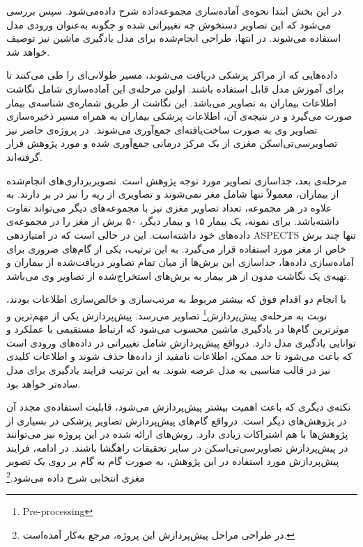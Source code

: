 

در این بخش ابتدا نحوه‌ی آماده‌سازی مجموعه‌داده شرح داده‌می‌شود.
سپس بررسی می‌شود که این تصاویر دستخوش چه تغییراتی شده و چگونه به‌عنوان ورودی مدل استفاده می‌شوند.
در انتها، طراحی انجام‌شده برای مدل یادگیری ماشین نیز توصیف خواهد شد.


داده‌هایی که از مراکز پزشکی دریافت می‌شوند، مسیر طولانی‌ای را طی می‌کنند تا برای آموزش مدل قابل استفاده باشند.
اولین مرحله‌ی این آماده‌سازی شامل نگاشت اطلاعات بیماران به تصاویر می‌باشد.
این نگاشت از طریق شماره‌ی شناسه‌ی بیمار صورت می‌گیرد 
و در نتیجه‌ی آن، اطلاعات پزشکی بیماران به همراه مسیر ذخیره‌سازی تصاویر وی به صورت ساخت‌یافته‌ای جمع‌آوری می‌شوند.\
در پروژه‌ی حاضر نیز تصاویرسی‌تی‌اسکن مغزی از یک مرکز درمانی جمع‌آوری شده و مورد پژوهش قرار گرفته‌اند.

مرحله‌ی بعد، جداسازی تصاویر مورد توجه پژوهش است.
تصویربرداری‌های انجام‌شده از بیماران، معمولاً تنها شامل مغز نمی‌شوند و تصاویری از ریه را نیز در بر دارند.
به علاوه در هر مجموعه، تعداد تصاویر مغزی نیز با مجموعه‌های دیگر می‌تواند تفاوت داشته‌باشد.
برای نمونه، یک بیمار ۱۵ و بیمار دیگر، ۵۰ برش از مغز را در مجموعه‌ی داده‌های خود داشته‌است.
این در حالی است که در امتیازدهی ASPECTS تنها چند برش خاص از مغز مورد استفاده قرار می‌گیرد.
به این ترتیب، یکی از گام‌های ضروری برای آماده‌سازی داده‌ها، جداسازی این برش‌ها از میان تمام 
تصاویر دریافت‌شده از بیماران و تهیه‌ی یک نگاشت مدون از هر بیمار به برش‌های استخراج‌شده از تصاویر وی می‌باشد.

با انجام دو اقدام فوق که بیشتر مربوط به مرتب‌سازی و خالص‌سازی اطلاعات بودند، نوبت به مرحله‌ی 
پیش‌پردازش\footnote{Pre-processing}
تصاویر می‌رسد.
پیش‌پردازش یکی از مهم‌ترین و موثرترین گام‌ها در یادگیری ماشین محسوب می‌شود که ارتباط مستقیمی با عملکرد و توانایی یادگیری مدل دارد. 
درواقع پیش‌پردازش شامل تغییراتی در داده‌های ورودی است که باعث می‌شود تا حد ممکن، اطلاعات نامفید از داد‌ه‌ها حذف شوند و اطلاعات کلیدی نیز در قالب مناسبی به مدل عرضه شوند.
به این ترتیب فرایند یادگیری برای مدل ساده‌تر خواهد بود.

نکته‌ی دیگری که باعث اهمیت بیشتر پیش‌پردازش می‌شود، قابلیت استفاده‌ی مجدد آن در پژوهش‌های دیگر است.
درواقع گام‌های پیش‌پردازش تصاویر پزشکی در بسیاری از پژوهش‌ها با هم اشتراکات زیادی دارد.
روش‌های ارائه شده در این پروژه نیز می‌توانند در پیش‌پردازش تصاویرسی‌تی‌اسکن در سایر تحقیقات راهگشا باشند.
در ادامه، فرایند پیش‌پردازش مورد استفاده در این پژوهش، به صورت گام به گام بر روی یک تصویر مغزی انتخابی شرح داده می‌شود.\footnote{در طراحی مراحل پیش‌پردازش این پروژه، مرجع \cite{ma2020medical} به‌کار آمده‌است.}


